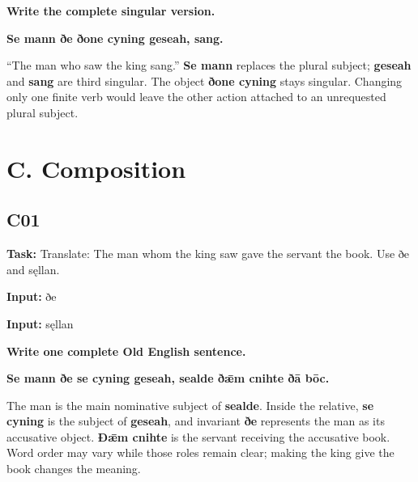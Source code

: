 \par\begin{minipage}{\linewidth}\raggedright
\textbf{Write the complete singular version.}

\textbf{Se mann ðe ðone cyning geseah, sang.}
\end{minipage}\par

“The man who saw the king sang.” \textbf{Se mann} replaces the plural subject; \textbf{geseah} and \textbf{sang} are third singular. The object \textbf{ðone cyning} stays singular. Changing only one finite verb would leave the other action attached to an unrequested plural subject.

\clearpage
\section*{C. Composition}

\subsection*{C01}

\textbf{Task:} Translate: The man whom the king saw gave the servant the book. Use ðe and sęllan.

\textbf{Input:} ðe

\textbf{Input:} sęllan

\par\begin{minipage}{\linewidth}\raggedright
\textbf{Write one complete Old English sentence.}

\textbf{Se mann ðe se cyning geseah, sealde ðǣm cnihte ðā bōc.}
\end{minipage}\par

The man is the main nominative subject of \textbf{sealde}. Inside the relative, \textbf{se cyning} is the subject of \textbf{geseah}, and invariant \textbf{ðe} represents the man as its accusative object. \textbf{Ðǣm cnihte} is the servant receiving the accusative book. Word order may vary while those roles remain clear; making the king give the book changes the meaning.

